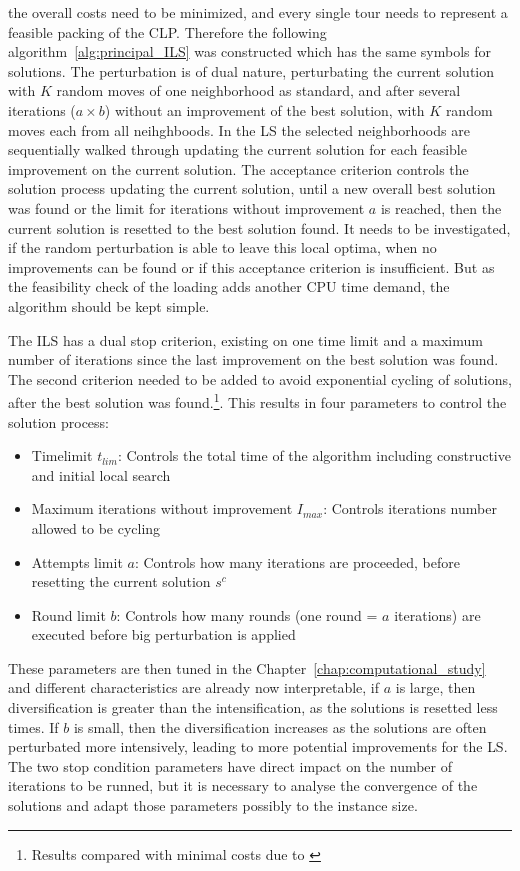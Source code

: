 the overall costs need to be minimized, and every single tour needs to represent a feasible packing of the \gls{CLP}.
Therefore the following algorithm~\ref{alg:principal_ILS} was constructed which has the same symbols for solutions. The perturbation
is of dual nature, perturbating the current solution with $K$ random moves of one neighborhood as standard, and after
several iterations ($a\times b$) without an improvement of the best solution, with $K$ random moves each from all neihghboods. In the \gls{LS}
the selected neighborhoods are sequentially walked through updating the current solution for each feasible improvement on
the current solution. The acceptance criterion controls the solution process updating the current solution, until a new overall
best solution was found or the limit for iterations without improvement $a$ is reached, then the current solution is resetted
to the best solution found. It needs to be investigated, if the random perturbation is able to leave this local optima,
when no improvements can be found or if this acceptance criterion is insufficient. But as the feasibility check of the loading
adds another CPU time demand, the algorithm should be kept simple.



The \gls{ILS} has a dual stop criterion, existing on one
time limit and a maximum number of iterations since the last improvement on the best solution was found. The second criterion
needed to be added to avoid exponential cycling of solutions, after the best solution was found.\footnote{Results compared with
    minimal costs due to \cite{tamke_branch-and-cut_2024}}. This results in four parameters to control the solution process:
\begin{itemize}
    \item Timelimit $t_{lim}$: Controls the total time of the algorithm including constructive and initial local search
    \item Maximum iterations without improvement $I_{max}$: Controls iterations number allowed to be cycling
    \item Attempts limit $a$: Controls how many iterations are proceeded, before resetting the current solution $s^c$
    \item Round limit $b$: Controls how many rounds (one round = $a$ iterations) are executed before big perturbation is applied
\end{itemize}

These parameters are then tuned in the Chapter~\ref{chap:computational_study} and different characteristics are already now
interpretable, if $a$ is large, then diversification is greater than the intensification, as the solutions is resetted less
times. If $b$ is small, then the diversification increases as the solutions are often perturbated more intensively, leading
to more potential improvements for the \gls{LS}. The two stop condition parameters have direct impact on the number of iterations
to be runned, but it is necessary to analyse the convergence of the solutions and adapt those parameters possibly to the
instance size.

